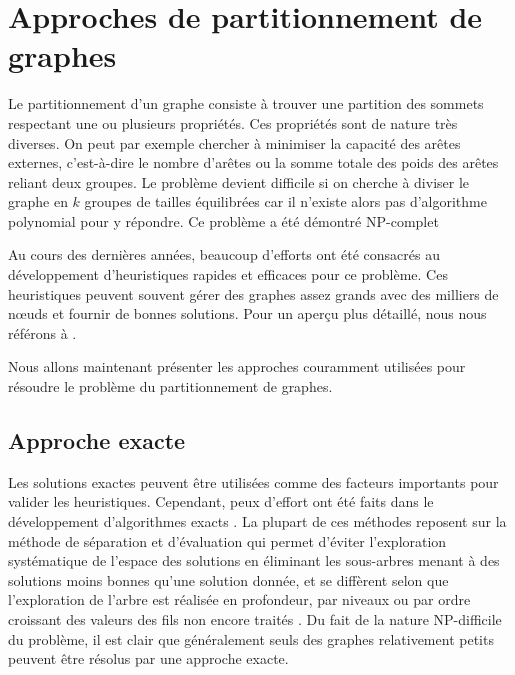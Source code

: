 
\section{Approches de partitionnement de graphes}
 Le partitionnement d'un graphe consiste à trouver une partition des sommets respectant une ou plusieurs propriétés. Ces propriétés sont de nature très diverses. On peut par exemple chercher à minimiser la capacité des arêtes externes, c'est-à-dire le nombre d'arêtes ou la somme totale des poids des arêtes reliant deux groupes.  Le problème devient difficile si on cherche à diviser le graphe en $k$ groupes de tailles équilibrées car il n'existe alors pas d'algorithme polynomial pour y répondre. Ce problème a été démontré NP-complet \citep{HYAFIL1973,GAREY1976}

Au cours des dernières années, beaucoup d'efforts ont été consacrés au développement d'heuristiques rapides et efficaces pour ce problème. Ces heuristiques peuvent souvent gérer des graphes assez grands avec des milliers de nœuds et fournir de bonnes solutions. Pour un aperçu plus détaillé, nous nous référons à \citep{BichotSiarry2013,BULU2016,SCHLOEGEL2000}.

Nous allons maintenant présenter les approches couramment utilisées pour résoudre le problème du partitionnement de graphes.


\subsection*{Approche exacte}
Les solutions exactes peuvent être utilisées comme des facteurs importants pour valider les heuristiques. Cependant, peux d'effort ont été faits dans le développement d'algorithmes exacts \citep{Armbruster2008,Bonami2012,Delling2012,FeldmannWidmayer2015,Ferreira1998,Hager2013,Kaibel2011,Sellmann2003,Sorensen2007}. La plupart de ces méthodes reposent sur la méthode de séparation et d'évaluation qui permet d'éviter l'exploration systématique de l'espace des solutions en éliminant les sous-arbres menant à des solutions moins bonnes qu'une solution donnée, et se diffèrent selon que l'exploration de l'arbre est réalisée en profondeur, par niveaux ou par ordre croissant des valeurs des fils non encore traités \citep{Land2010}.
Du fait de la nature NP-difficile du problème, il est clair que généralement seuls des graphes relativement petits peuvent être résolus par une approche exacte.

